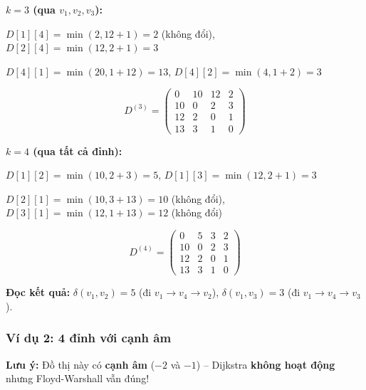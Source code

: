 \documentclass[10pt]{article}
\begin{document}
\textbf{$k = 3$ (qua $v_1, v_2, v_3$):}

$D[1][4] = \min(2, 12+1) = 2$ (không đổi), \quad $D[2][4] = \min(12, 2+1) = 3$

$D[4][1] = \min(20, 1+12) = 13$, \quad $D[4][2] = \min(4, 1+2) = 3$

$$D^{(3)} = \begin{pmatrix} 0 & 10 & 12 & 2 \\ 10 & 0 & 2 & 3 \\ 12 & 2 & 0 & 1 \\ 13 & 3 & 1 & 0 \end{pmatrix}$$

\textbf{$k = 4$ (qua tất cả đỉnh):}

$D[1][2] = \min(10, 2+3) = 5$, \quad $D[1][3] = \min(12, 2+1) = 3$

$D[2][1] = \min(10, 3+13) = 10$ (không đổi), \quad $D[3][1] = \min(12, 1+13) = 12$ (không đổi)

$$\boxed{D^{(4)} = \begin{pmatrix} 0 & 5 & 3 & 2 \\ 10 & 0 & 2 & 3 \\ 12 & 2 & 0 & 1 \\ 13 & 3 & 1 & 0 \end{pmatrix}}$$

\textbf{Đọc kết quả:} $\delta(v_1, v_2) = 5$ (đi $v_1 \to v_4 \to v_2$), $\delta(v_1, v_3) = 3$ (đi $v_1 \to v_4 \to v_3$).

\subsubsection{Ví dụ 2: 4 đỉnh với cạnh âm}\label{vd-floyd-canh-am}

\textbf{Lưu ý:} Đồ thị này có \textbf{cạnh âm} ($-2$ và $-1$) -- Dijkstra \textbf{không hoạt động} nhưng Floyd-Warshall vẫn đúng!
\end{document}
